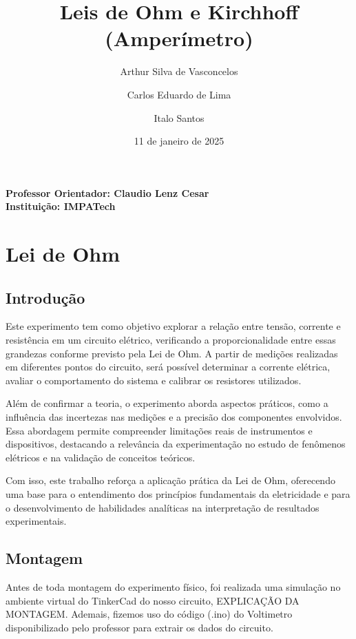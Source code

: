 \documentclass[a4paper,12pt]{article}
\title{\textbf{Leis de Ohm e Kirchhoff (Amperímetro)}}
\author{
    Arthur Silva de Vasconcelos \and Carlos Eduardo de Lima \and Italo Santos
}
\date{11 de janeiro de 2025}
\begin{document}
\maketitle
\begin{center}
    \textbf{Professor Orientador: Claudio Lenz Cesar} \\
    \textbf{Instituição: IMPATech}
\end{center}
\vspace{1cm}

\section{Lei de Ohm}
\subsection{Introdução}
\leavevmode

Este experimento tem como objetivo explorar a relação entre tensão, corrente e resistência em um circuito elétrico, verificando a proporcionalidade entre essas grandezas conforme previsto pela Lei de Ohm. A partir de medições realizadas em diferentes pontos do circuito, será possível determinar a corrente elétrica, avaliar o comportamento do sistema e calibrar os resistores utilizados.  

Além de confirmar a teoria, o experimento aborda aspectos práticos, como a influência das incertezas nas medições e a precisão dos componentes envolvidos. Essa abordagem permite compreender limitações reais de instrumentos e dispositivos, destacando a relevância da experimentação no estudo de fenômenos elétricos e na validação de conceitos teóricos.  

Com isso, este trabalho reforça a aplicação prática da Lei de Ohm, oferecendo uma base para o entendimento dos princípios fundamentais da eletricidade e para o desenvolvimento de habilidades analíticas na interpretação de resultados experimentais.

\subsection{Montagem}
\leavevmode

Antes de toda montagem do experimento físico, foi realizada uma simulação no ambiente virtual do TinkerCad do nosso circuito, EXPLICAÇÃO DA MONTAGEM. Ademais, fizemos uso do código (.ino) do Voltimetro disponibilizado pelo professor para extrair os dados do circuito.

\vspace{1em}
\end{document}

